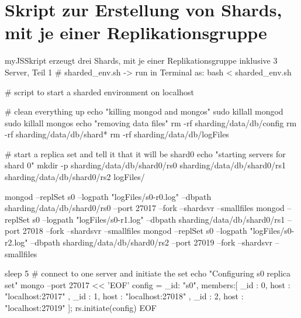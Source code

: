 \section{Skript zur Erstellung von Shards, mit je einer Replikationsgruppe}

\begin{listingsboxJavaScript}[label={lst:createShards}]{myJS}{Skript erzeugt drei Shards, mit je einer Replikationsgruppe inklusive 3 Server, Teil 1}
# sharded_env.sh -> run in Terminal as: bash < sharded_env.sh

# script to start a sharded environment on localhost

# clean everything up
echo "killing mongod and mongos"
sudo killall mongod
sudo killall mongos
echo "removing data files"
rm -rf sharding/data/db/config
rm -rf sharding/data/db/shard*
rm -rf sharding/data/db/logFiles

# start a replica set and tell it that it will be shard0
echo "starting servers for shard 0"
mkdir -p sharding/data/db/shard0/rs0 sharding/data/db/shard0/rs1 
sharding/data/db/shard0/rs2 logFiles/

mongod --replSet s0 --logpath "logFiles/s0-r0.log" 
--dbpath sharding/data/db/shard0/rs0 --port 27017 --fork --shardsvr --smallfiles
mongod --replSet s0 --logpath "logFiles/s0-r1.log" 
--dbpath sharding/data/db/shard0/rs1 --port 27018 --fork --shardsvr --smallfiles
mongod --replSet s0 --logpath "logFiles/s0-r2.log" 
--dbpath sharding/data/db/shard0/rs2 --port 27019 --fork --shardsvr --smallfiles

sleep 5
# connect to one server and initiate the set
echo "Configuring s0 replica set"
mongo --port 27017 << 'EOF'
config = { _id: "s0", members:[
          { _id : 0, host : "localhost:27017" },
          { _id : 1, host : "localhost:27018" },
          { _id : 2, host : "localhost:27019" }]};
rs.initiate(config)
EOF
\end{listingsboxJavaScript}

